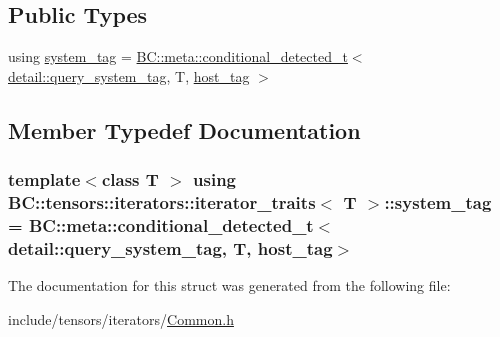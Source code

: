 \subsection*{Public Types}
\begin{DoxyCompactItemize}
\item 
using \hyperlink{structBC_1_1tensors_1_1iterators_1_1iterator__traits_a1f2a24e329c5f2312a7cb4dd84ed3156}{system\+\_\+tag} = \hyperlink{namespaceBC_1_1meta_a96ed28f49a8ffe8f0bae28da99e6ee18}{B\+C\+::meta\+::conditional\+\_\+detected\+\_\+t}$<$ \hyperlink{namespaceBC_1_1tensors_1_1iterators_1_1detail_aa3c122c5f746d0b9aef7e6f24b520f13}{detail\+::query\+\_\+system\+\_\+tag}, T, \hyperlink{structBC_1_1host__tag}{host\+\_\+tag} $>$
\end{DoxyCompactItemize}


\subsection{Member Typedef Documentation}
\subsubsection[{\texorpdfstring{system\+\_\+tag}{system_tag}}]{\setlength{\rightskip}{0pt plus 5cm}template$<$class T $>$ using {\bf B\+C\+::tensors\+::iterators\+::iterator\+\_\+traits}$<$ T $>$\+::{\bf system\+\_\+tag} =  {\bf B\+C\+::meta\+::conditional\+\_\+detected\+\_\+t}$<$ {\bf detail\+::query\+\_\+system\+\_\+tag}, T, {\bf host\+\_\+tag}$>$}\hypertarget{structBC_1_1tensors_1_1iterators_1_1iterator__traits_a1f2a24e329c5f2312a7cb4dd84ed3156}{}\label{structBC_1_1tensors_1_1iterators_1_1iterator__traits_a1f2a24e329c5f2312a7cb4dd84ed3156}


The documentation for this struct was generated from the following file\+:\begin{DoxyCompactItemize}
\item 
include/tensors/iterators/\hyperlink{tensors_2iterators_2Common_8h}{Common.\+h}\end{DoxyCompactItemize}
